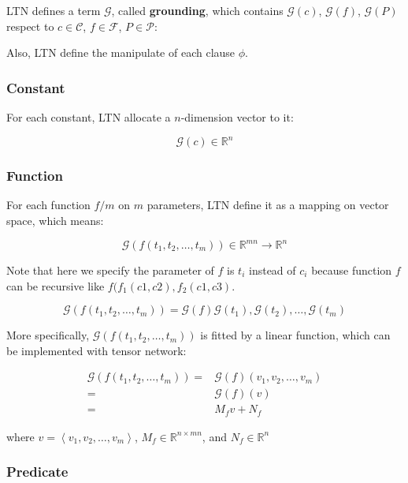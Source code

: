 LTN defines a term $\mathcal{G}$, called \textbf{grounding}, which contains $\mathcal{G}(c)$, $\mathcal{G}(f)$, $\mathcal{G}(P)$ respect to $c \in \mathcal{C}$, $f\in \mathcal{F}$, $P \in \mathcal{P}$:

Also, LTN define the manipulate of each clause $\phi$.

\subsubsection{Constant}
For each constant, LTN allocate a $n$-dimension vector to it:

\begin{equation}
    \mathcal{G}(c) \in \mathbb{R}^n
\end{equation}

\subsubsection{Function}

For each function $f/m$ on $m$ parameters, LTN define it as a mapping on vector space, which means:

\begin{equation}
    \mathcal{G}(f(t_1,t_2,\dots,t_m)) \in \mathbb{R}^{mn}\rightarrow \mathbb{R}^n
\end{equation}

Note that here we specify the parameter of $f$ is $t_i$ instead of $c_i$ because function $f$ can be recursive like $f(f_1(c1,c2),f_2(c1,c3)$.

\begin{equation}
    \mathcal{G}(f(t_1,t_2,\dots,t_m))=\mathcal{G}(f)\mathcal{G}(t_1),\mathcal{G}(t_2),\dots,\mathcal{G}(t_m)
\end{equation}

More specifically, $\mathcal{G}(f(t_1,t_2,\dots,t_m))$ is fitted by a linear function, which can be implemented with tensor network:

\begin{align}
    \mathcal{G}(f(t_1,t_2,\dots,t_m)) =&\mathcal{G}(f)(v_1,v_2,\dots,v_m) \nonumber\\
    =&\mathcal{G}(f)(v) \nonumber\\
    =&M_f v+N_f
\end{align}

where $v=\left< v_1,v_2,\dots,v_m \right>$, $M_f \in \mathbb{R}^{n\times mn}$, and $N_f \in \mathbb{R}^{n}$

\subsubsection{Predicate}

